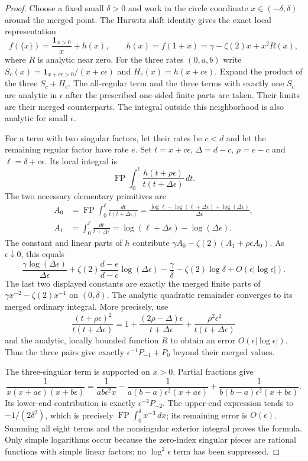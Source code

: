 \begin{proof}
Choose a fixed small $\delta>0$ and work in the circle coordinate
$x\in(-\delta,\delta)$ around the merged point. The Hurwitz shift
identity \cite[Equation~25.11.3]{DLMFHurwitz} gives the exact local representation
\[
 f(\{x\})=\frac{\mathbf 1_{x>0}}x+h(x),\qquad
 h(x)=f(1+x)=\gamma-\zeta(2)x+x^2R(x),
\]
where $R$ is analytic near zero. For the three rates $(0,a,b)$ write
$S_c(x)=\mathbf 1_{x+c\epsilon>0}/(x+c\epsilon)$ and
$H_c(x)=h(x+c\epsilon)$. Expand the product of the three $S_c+H_c$.
The all-regular term and the three terms with exactly one $S_c$ are
analytic in $\epsilon$ after the prescribed one-sided finite parts
are taken. Their limits are their merged counterparts. The integral
outside this neighborhood is also analytic for small $\epsilon$.

For a term with two singular factors, let their rates be $c<d$ and
let the remaining regular factor have rate $e$. Set
$t=x+c\epsilon$, $\Delta=d-c$, $\rho=e-c$ and $\ell=\delta+c\epsilon$.
Its local integral is
\[
 \operatorname{FP}\int_0^\ell
     \frac{h(t+\rho\epsilon)}{t(t+\Delta\epsilon)}\,dt.
\]
The two necessary elementary primitives are
\begin{align*}
 A_0&=\operatorname{FP}\int_0^\ell\frac{dt}{t(t+\Delta\epsilon)}
 =\frac{\log\ell-\log(\ell+\Delta\epsilon)
                  +\log(\Delta\epsilon)}{\Delta\epsilon},\\
 A_1&=\int_0^\ell\frac{dt}{t+\Delta\epsilon}
 =\log(\ell+\Delta\epsilon)-\log(\Delta\epsilon).
\end{align*}
The constant and linear parts of $h$ contribute
$\gamma A_0-\zeta(2)(A_1+\rho\epsilon A_0)$. As $\epsilon\downarrow0$,
this equals
\[
 \frac{\gamma\log(\Delta\epsilon)}{\Delta\epsilon}
 +\zeta(2)\frac{d-e}{d-c}\log(\Delta\epsilon)
 -\frac\gamma\delta-\zeta(2)\log\delta+O(\epsilon|\log\epsilon|).
\]
The last two displayed constants are exactly the merged finite parts
of $\gamma x^{-2}-\zeta(2)x^{-1}$ on $(0,\delta)$.
The analytic quadratic remainder converges to its merged ordinary
integral. More precisely, use
\[
 \frac{(t+\rho\epsilon)^2}{t(t+\Delta\epsilon)}
 =1+\frac{(2\rho-\Delta)\epsilon}{t+\Delta\epsilon}
       +\frac{\rho^2\epsilon^2}{t(t+\Delta\epsilon)}
\]
and the analytic, locally bounded function $R$ to obtain an error
$O(\epsilon|\log\epsilon|)$. Thus the three pairs give exactly
$\epsilon^{-1}P_{-1}+P_0$ beyond their merged values.

The three-singular term is supported on $x>0$. Partial fractions give
\[
 \frac1{x(x+a\epsilon)(x+b\epsilon)}
 =\frac1{ab\epsilon^2x}
  -\frac1{a(b-a)\epsilon^2(x+a\epsilon)}
  +\frac1{b(b-a)\epsilon^2(x+b\epsilon)}.
\]
Its lower-end contribution is exactly $\epsilon^{-2}P_{-2}$. The
upper-end expression tends to $-1/(2\delta^2)$, which is precisely
$\operatorname{FP}\int_0^\delta x^{-3}\,dx$; its remaining error is
$O(\epsilon)$. Summing all eight terms and the nonsingular exterior
integral proves the formula. Only simple logarithms occur because the
zero-index singular pieces are rational functions with simple linear
factors; no $\log^2\epsilon$ term has been suppressed.
\end{proof}

